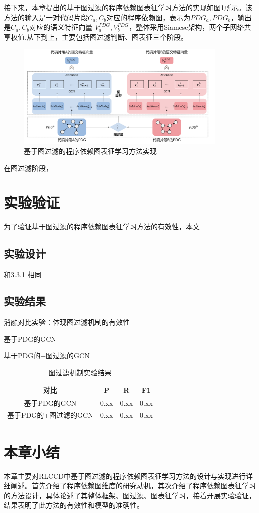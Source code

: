 接下来，本章提出的基于图过滤的程序依赖图表征学习方法的实现如图\ref{fig:pdg}所示。该方法的输入是一对代码片段$C_{a},C_{b}$对应的程序依赖图，表示为$PDG_{a},PDG_{b}$，输出是$C_{a},C_{b}$对应的语义特征向量 $V_{a}^{PDG},V_{b}^{PDG}$，整体采用Siamese架构，两个子网络共享权值,从下到上，主要包括图过滤判断、图表征三个阶段。

\begin{figure}[H]
  \centering
  \includegraphics[width=0.9\textwidth]{figures/pdg.png}
  \caption{基于图过滤的程序依赖图表征学习方法实现}\label{fig:pdg}
\end{figure}

在图过滤阶段，

\section{实验验证}
\label{sec:PDGExperiment}
为了验证基于图过滤的程序依赖图表征学习方法的有效性，本文
\subsection{实验设计}
\label{sec:PDGDesign}
和3.3.1 相同
\subsection{实验结果}
\label{subsec:PDGResult}
消融对比实验：体现图过滤机制的有效性

基于PDG的GCN

基于PDG的+图过滤的GCN


\begin{table}
  \centering
  \caption{图过滤机制实验结果} %
  \begin{tabular*}{0.9\textwidth}{@{\extracolsep{\fill}}cccc}
  \toprule
    对比			&P		&R		&F1 \\
  \midrule
    基于PDG的GCN			&0.xx	&0.xx		&0.xx \\
    基于PDG的+图过滤的GCN			&0.xx		&0.xx		&0.xx \\
  \bottomrule
  \end{tabular*}
\end{table}

\section{本章小结}
\label{sec:Summary5}
本章主要对RLCCD中基于图过滤的程序依赖图表征学习方法的设计与实现进行详细阐述。首先介绍了程序依赖图维度的研究动机，其次介绍了程序依赖图表征学习的方法设计，具体论述了其整体框架、图过滤、图表征学习，接着开展实验验证，结果表明了此方法的有效性和模型的准确性。



